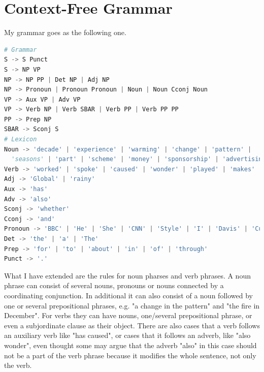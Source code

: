 \documentclass[11pt]{article} %
\begin{document}
\section{Context-Free Grammar}

My grammar goes as the following one.

\begin{lstlisting}[language=Python, frame=single, showstringspaces=false]
# Grammar
S -> S Punct
S -> NP VP
NP -> NP PP | Det NP | Adj NP
NP -> Pronoun | Pronoun Pronoun | Noun | Noun Cconj Noun
VP -> Aux VP | Adv VP
VP -> Verb NP | Verb SBAR | Verb PP | Verb PP PP
PP -> Prep NP
SBAR -> Sconj S
# Lexicon
Noun -> 'decade' | 'experience' | 'warming' | 'change' | 'pattern' |
  'seasons' | 'part' | 'scheme' | 'money' | 'sponsorship' | 'advertising'
Verb -> 'worked' | 'spoke' | 'caused' | 'wonder' | 'played' | 'makes'
Adj -> 'Global' | 'rainy'
Aux -> 'has'
Adv -> 'also'
Sconj -> 'whether'
Cconj -> 'and'
Pronoun -> 'BBC' | 'He' | 'She' | 'CNN' | 'Style' | 'I' | 'Davis' | 'Cup'
Det -> 'the' | 'a' | 'The'
Prep -> 'for' | 'to' | 'about' | 'in' | 'of' | 'through'
Punct -> '.'
\end{lstlisting}

What I have extended are the rules for noun pharses and verb phrases. A noun phrase can consist of several nouns, pronouns or nouns connected by a coordinating conjunction. In additional it can also consist of a noun followed by one or several prepositional phrases, e.g. "a change in the pattern" and "the fire in December". For verbs they can have nouns, one/several prepositional phrase, or even a subjordinate clause as their object. There are also cases that a verb follows an auxiliary verb like "has caused", or cases that it follows an adverb, like "also wonder", even thought some may argue that the adverb "also" in this case should not be a part of the verb phrase because it modifies the whole sentence, not only the verb.
\end{document}
